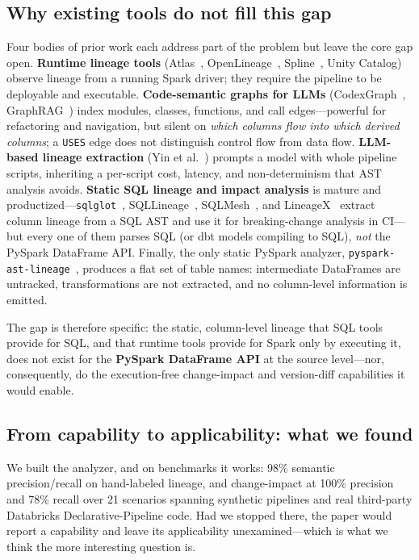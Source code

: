 \documentclass[11pt]{article}
\newcommand{\code}[1]{\texttt{#1}}
\begin{document}
\subsection{Why existing tools do not fill this gap}
Four bodies of prior work each address part of the problem but leave the core gap
open. \textbf{Runtime lineage tools} (Atlas~\cite{atlas}, OpenLineage~\cite{ol},
Spline~\cite{spline}, Unity Catalog) observe lineage from a running Spark driver;
they require the pipeline to be deployable and executable. \textbf{Code-semantic
graphs for LLMs} (CodexGraph~\cite{codexgraph}, GraphRAG~\cite{graphrag}) index
modules, classes, functions, and call edges---powerful for refactoring and
navigation, but silent on \emph{which columns flow into which derived columns}; a
\code{USES} edge does not distinguish control flow from data flow. \textbf{LLM-based
lineage extraction} (Yin et al.~\cite{yin}) prompts a model with whole pipeline
scripts, inheriting a per-script cost, latency, and non-determinism that AST
analysis avoids. \textbf{Static SQL lineage and impact analysis} is mature and
productized---\code{sqlglot}~\cite{sqlglot}, SQLLineage~\cite{sqllineage},
SQLMesh~\cite{sqlmesh}, and LineageX~\cite{lineagex} extract column lineage from a
SQL AST and use it for breaking-change analysis in CI---but every one of them
parses SQL (or dbt models compiling to SQL), \emph{not} the PySpark DataFrame API.
Finally, the only static PySpark analyzer, \code{pyspark-ast-lineage}~\cite{pyspark},
produces a flat set of table names: intermediate DataFrames are untracked,
transformations are not extracted, and no column-level information is emitted.

The gap is therefore specific: the static, column-level lineage that SQL tools
provide for SQL, and that runtime tools provide for Spark only by executing it, does
not exist for the \textbf{PySpark DataFrame API} at the source level---nor,
consequently, do the execution-free change-impact and version-diff capabilities it
would enable.

\subsection{From capability to applicability: what we found}
\label{sec:whatwefound}
We built the analyzer, and on benchmarks it works: 98\% semantic precision/recall on
hand-labeled lineage, and change-impact at 100\% precision and 78\% recall over 21
scenarios spanning synthetic pipelines and real third-party Databricks
Declarative-Pipeline code. Had we stopped there, the paper would report a capability
and leave its applicability unexamined---which is what we think the more interesting
question is.
\end{document}
